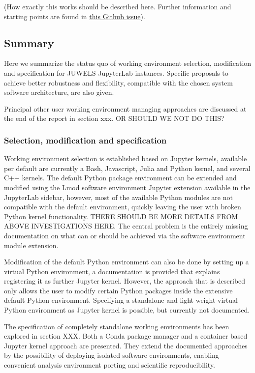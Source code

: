 \documentclass[11pt,a4paper]{article}
\begin{document}
(How exactly this works should be described here. Further information and starting points are found in \href{https://github.com/ExaESM-WP4/JupyterHub-Evaluation-Whitepaper/issues/6}{this Github issue}).

\subsection{Summary}
\label{sect:working-envs:summary}

Here we summarize the status quo of working environment selection, modification and specification for JUWELS JupyterLab instances.
Specific proposals to achieve better robustness and flexibility, compatible with the chosen system software architecture, are also given.

Principal other user working environment managing approaches are discussed at the end of the report in section xxx. OR SHOULD WE NOT DO THIS?

\subsubsection{Selection, modification and specification}

Working environment selection is established based on Jupyter kernels, available per default are currently a Bash, Javascript, Julia and Python kernel, and several C++ kernels.
The default Python package environment can be extended and modified using the Lmod software environment Jupyter extension available in the JupyterLab sidebar, however, most of the available Python modules are not compatible with the default environment, quickly leaving the user with broken Python kernel functionality.
THERE SHOULD BE MORE DETAILS FROM ABOVE INVESTIGATIONS HERE.
The central problem is the entirely missing documentation on what can or should be achieved via the software environment module extension.

Modification of the default Python environment can also be done by setting up a virtual Python environment, a documentation is provided that explains registering it as further Jupyter kernel.
However, the approach that is described only allows the user to modify certain Python packages inside the extensive default Python environment.
Specifying a standalone and light-weight virtual Python environment as Jupyter kernel is possible, but currently not documented.

The specification of completely standalone working environments has been explored in section XXX.
Both a Conda package manager and a container based Jupyter kernel approach are presented.
They extend the documented approaches by the possibility of deploying isolated software environments, enabling convenient analysis environment porting and scientific reproducibility.
\end{document}
